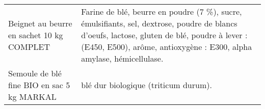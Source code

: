 \begin{longtable}{p{5cm}p{10cm}}
                                                                Beignet au beurre en sachet 10 kg COMPLET &                                                                                                                                                                                                                                                                                                                                                                                                                                                                                                                                                                                                                                                                                                                                                                                                                     Farine de blé, beurre en poudre (7 \%), sucre, émulsifiants, sel, dextrose, poudre de blancs d'oeufs, lactose, gluten de blé, poudre à lever : (E450, E500), arôme, antioxygène : E300, alpha amylase, hémicellulase. \\
                                                               Semoule de blé fine BIO en sac 5 kg MARKAL &                                                                                                                                                                                                                                                                                                                                                                                                                                                                                                                                                                                                                                                                                                                                                                                                                                                                                                                                                                                                     blé dur biologique (triticum durum). \\

\end{longtable}
